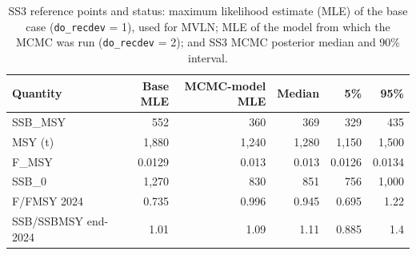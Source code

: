 \begin{table}[H]

\caption{\label{tab:refpts}SS3 reference points and status: maximum likelihood estimate (MLE) of the base case (\texttt{do\_recdev} = 1), used for MVLN; MLE of the model from which the MCMC was run (\texttt{do\_recdev} = 2); and SS3 MCMC posterior median and 90\% interval.}
\centering
\begin{tabular}[t]{lrrrrr}
\toprule
Quantity & Base MLE & MCMC-model MLE & Median & 5\% & 95\%\\
\midrule
SSB\_MSY & 552 & 360 & 369 & 329 & 435\\
MSY (t) & 1,880 & 1,240 & 1,280 & 1,150 & 1,500\\
F\_MSY & 0.0129 & 0.013 & 0.013 & 0.0126 & 0.0134\\
SSB\_0 & 1,270 & 830 & 851 & 756 & 1,000\\
F/FMSY 2024 & 0.735 & 0.996 & 0.945 & 0.695 & 1.22\\
\addlinespace
SSB/SSBMSY end-2024 & 1.01 & 1.09 & 1.11 & 0.885 & 1.4\\
\bottomrule
\end{tabular}
\end{table}
